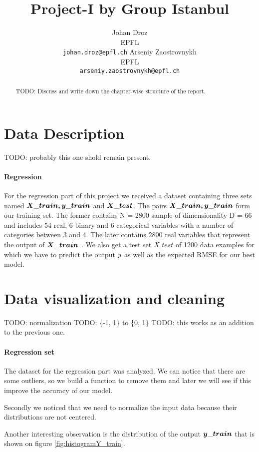 \documentclass{article} %
\title{Project-I by Group Istanbul}
\author{
Johan Droz\\
EPFL \\
\texttt{johan.droz@epfl.ch} \And
Arseniy Zaostrovnykh\\
EPFL \\
\texttt{arseniy.zaostrovnykh@epfl.ch}
}
\newcommand{\todo}[1]{}
\renewcommand{\todo}[1]{{\color{red} TODO: {#1}}}
\begin{document}
\maketitle

\begin{abstract}
\todo{Discuss and write down the chapter-wise structure of the report.}

\end{abstract}

\section{Data Description}
\todo{probably this one shold remain present.}
\paragraph{Regression} For the regression part of this project we received a dataset containing three sets named $\boldmath{X\_train, y\_train}$ and $\boldmath{X\_test}$. The pairs $\boldmath{X\_train, y\_train}$  form our training set. 
The former contains N = 2800 sample of dimensionality D = 66 and includes 54 real, 6 binary and 6 categorical variables with a number of categories between 3 and 4.
The later contains 2800 real variables that represent the output of $\boldmath{X\_train}$ .
We also get a test set $X\_test$ of 1200 data examples for which we have to predict the output $\boldmath{y}$ as well as the expected RMSE for our best model.

\section{Data visualization and cleaning}
\todo{normalization}
\todo{\{-1, 1\} to \{0, 1\}}
\todo{this works as an addition to the previous one.}
\paragraph{Regression set} The dataset for the regression part was analyzed.
We can notice that there are some outliers, so we build a function to remove them and later we will see if this improve the accuracy of our model.

Secondly we noticed that we need to normalize the input data because their distributions are not centered.

Another interesting observation is the distribution of the output $\boldmath{y\_train}$ that is shown on figure \ref{fig:histogramY_train}.
\end{document}
